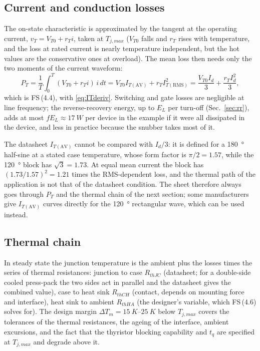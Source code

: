 \documentclass[10pt,a4paper]{scrartcl}
\newcommand{\Id}{I_{d}}
\newcommand{\ITav}{I_{T\mathrm{(AV)}}}
\newcommand{\ITrms}{I_{T\mathrm{(RMS)}}}
\newcommand{\fs}[1]{\textsf{FS}\,(#1)}
\begin{document}
\subsection{Current and conduction losses}
The on-state characteristic is approximated by the tangent at the operating current, $v_T = V_{T0} + r_T i$, taken at $T_{j,max}$ ($V_{T0}$ falls and $r_T$ rises with temperature, and the loss at rated current is nearly temperature independent, but the hot values are the conservative ones at overload). The mean loss then needs only the two moments of the current waveform:
\begin{equation}
P_T = \frac{1}{T}\int_0^T(V_{T0}+r_Ti)\,i\,dt = V_{T0}\ITav + r_T\ITrms^2 = \frac{V_{T0}\Id}{3} + \frac{r_T\Id^2}{3} ,
\label{eq:PTderiv}
\end{equation}
which is \fs{4.4}, with \eqref{eq:ITderiv}. Switching and gate losses are negligible at line frequency; the reverse-recovery energy, up to $E_L$ per turn-off (Sec.~\ref{sec:rr}), adds at most $fE_L\approx\SI{17}{W}$ per device in the example if it were all dissipated in the device, and less in practice because the snubber takes most of it.

The datasheet $\ITav$ cannot be compared with $\Id/3$: it is defined for a \SI{180}{\degree} half-sine at a stated case temperature, whose form factor is $\pi/2 = 1.57$, while the \SI{120}{\degree} block has $\sqrt3 = 1.73$. At equal mean current the block has $(1.73/1.57)^2 = 1.21$ times the RMS-dependent loss, and the thermal path of the application is not that of the datasheet condition. The sheet therefore always goes through $P_T$ and the thermal chain of the next section; some manufacturers give $\ITav$ curves directly for the \SI{120}{\degree} rectangular wave, which can be used instead.

\subsection{Thermal chain}
In steady state the junction temperature is the ambient plus the losses times the series of thermal resistances: junction to case $R_{thJC}$ (datasheet; for a double-side cooled press-pack the two sides act in parallel and the datasheet gives the combined value), case to heat sink $R_{thCH}$ (contact, depends on mounting force and interface), heat sink to ambient $R_{thHA}$ (the designer's variable, which \fs{4.6} solves for). The design margin $\Delta T_m = \SIrange{15}{25}{K}$ below $T_{j,max}$ covers the tolerances of the thermal resistances, the ageing of the interface, ambient excursions, and the fact that the thyristor blocking capability and $t_q$ are specified at $T_{j,max}$ and degrade above it.
\end{document}
